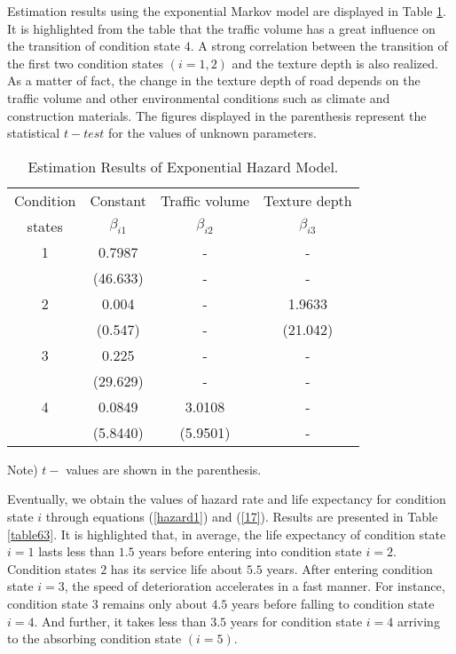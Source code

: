 Estimation results using the exponential Markov model are displayed in Table \ref{table62}. It is highlighted from the table that the traffic volume has a great influence on the transition of condition state $4$. A strong correlation between the transition of the first two condition states $(i=1,2)$ and the texture depth is also realized. As a matter of fact, the change in the texture depth of road depends on the traffic volume and other environmental conditions such as climate and construction materials. The figures displayed in the parenthesis represent the statistical $t-test$ for the values of unknown parameters.

\begin{table}[t]
\begin{center}
\caption{Estimation Results of Exponential Hazard Model.}
\label{table62}
{\small
\begin{tabular}{c|c|c|c}\hline
Condition & Constant&Traffic volume &Texture depth\\
 states & $\beta_{i1}$ & $\beta_{i2}$& $\beta_{i3}$\\ \hline
1 & 0.7987  &  - &  - \\
& (46.633) & -  &  -\\\hline
2 & 0.004 &  -  &  1.9633 \\\
& (0.547) &  - &  (21.042)\\\hline
3 & 0.225  &  - &  -\\
& (29.629) & - &  -\\\hline
4 & 0.0849 &  3.0108 &  -\\
& (5.8440) &(5.9501)&  -\\\hline
\end{tabular}
}
\end{center}
\footnotesize Note) $t-$ values are shown in the parenthesis.
\end{table}

Eventually, we obtain the values of hazard rate and life expectancy for condition state $i$ through equations (\ref{hazard1}) and (\ref{17}). Results are presented in Table \ref{table63}. It is highlighted that, in average, the life expectancy of condition state $i=1$ lasts less than $1.5$ years before entering into condition state $i=2$. Condition states $2$ has its service life about $5.5$ years. After entering condition state $i=3$, the speed of deterioration accelerates in a fast manner. For instance, condition state $3$ remains only about $4.5$ years before falling to condition state $i=4$. And further, it takes less than $3.5$ years for condition state $i=4$ arriving to the absorbing condition state $(i=5)$.


